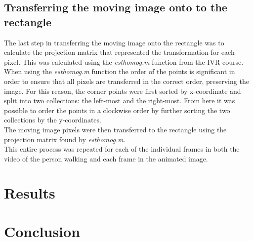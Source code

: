 \documentclass[11pt]{article}
\begin{document}
\subsection{Transferring the moving image onto to the rectangle}
The last step in transferring the moving image onto the rectangle was to calculate the projection matrix that represented the transformation for each pixel. This was calculated using the \emph{esthomog.m} function from the IVR course. When using the \emph{esthomog.m} function the order of the points is significant in order to ensure that all pixels are transferred in the correct order, preserving the image. For this reason, the corner points were first sorted by x-coordinate and split into two collections: the left-most and the right-most. From here it was possible to order the points in a clockwise order by further sorting the two collections by the y-coordinates. \\

The moving image pixels were then transferred to the rectangle using the projection matrix found by \emph{esthomog.m}. \\

This entire process was repeated for each of the individual frames in both the video of the person walking and each frame in the animated image.

\section{Results}


\section{Conclusion}
\end{document}
